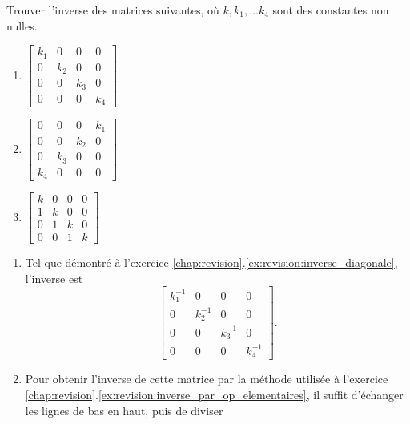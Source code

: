\begin{exercice}
  Trouver l'inverse des matrices suivantes, où $k, k_1, \dots k_4$
  sont des constantes non nulles.
  \begin{multicols}{3}
    \begin{enumerate}
    \item $%
      \begin{bmatrix}
        k_1 & 0 & 0 & 0 \\
        0 & k_2 & 0 & 0 \\
        0 & 0 & k_3 & 0 \\
        0 & 0 & 0 & k_4
      \end{bmatrix}$
    \item $%
      \begin{bmatrix}
        0 & 0 & 0 & k_1 \\
        0 & 0 & k_2 & 0 \\
        0 & k_3 & 0 & 0 \\
        k_4 & 0 & 0 & 0
      \end{bmatrix}$
    \item $%
      \begin{bmatrix}
        k & 0 & 0 & 0 \\
        1 & k & 0 & 0 \\
        0 & 1 & k & 0 \\
        0 & 0 & 1 & k
      \end{bmatrix}$
    \end{enumerate}
  \end{multicols}
  \begin{sol}
    \begin{enumerate}
    \item Tel que démontré à l'exercice
      \ref{chap:revision}.\ref{ex:revision:inverse_diagonale},
      l'inverse est
      \begin{displaymath}
        \begin{bmatrix}
          k_1^{-1} & 0 & 0 & 0 \\
          0 & k_2^{-1} & 0 & 0 \\
          0 & 0 & k_3^{-1} & 0 \\
          0 & 0 & 0 & k_4^{-1}
        \end{bmatrix}.
      \end{displaymath}
    \item Pour obtenir l'inverse de cette matrice par la méthode
      utilisée à l'exercice
      \ref{chap:revision}.\ref{ex:revision:inverse_par_op_elementaires},
      il suffit d'échanger les lignes de bas en haut, puis de diviser

\end{enumerate}
\end{sol}
\end{exercice}
